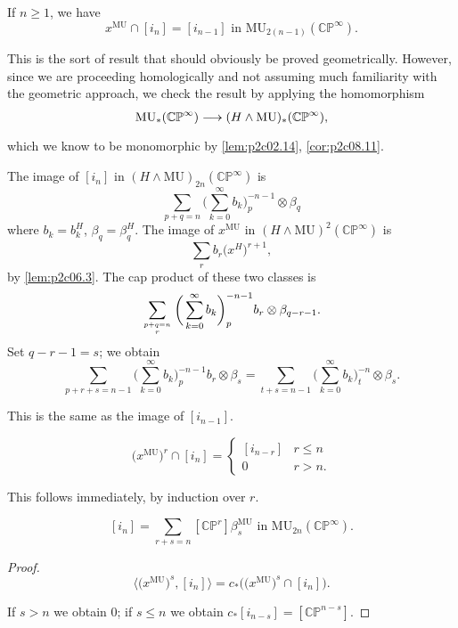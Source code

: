 \documentclass[../main]{subfiles}
\begin{document}
\begin{lemma}
\label{lem:ch210.3}
If $n \ge 1$, we have \[x^{\mathrm{MU}} \cap [i_n] = [i_{n - 1}] \text { in } \mathrm{MU}_{2(n - 1)} (\mathbb {CP}^\infty).\]
\end{lemma}

This is the sort of result that should obviously be proved geometrically. However, since we are proceeding homologically and not assuming much familiarity with the geometric approach, we check the result by applying the homomorphism \[\mathrm{MU}_\ast (\mathbb {CP}^\infty) \lar{} (H \wedge \mathrm{MU})_\ast (\mathbb {CP}^\infty),\] which we know to be monomorphic by \ref{lem:p2c02.14}, \ref{cor:p2c08.11}. 

The image of $[i_n]$ in $(H \wedge \mathrm{MU})_{2n} (\mathbb {CP}^\infty)$ is \[\sum_{p + q = n} \bigg(\sum_{k = 0}^\infty b_k\bigg)_p^{-n - 1} \otimes \beta_q\] where $b_k = b_k^H$, $\beta_q = \beta_q^H$. The image of $x^{\mathrm{MU}}$ in $(H \wedge \mathrm{MU})^2(\mathbb {CP}^\infty)$ is \[\sum_r b_r \big(x^H\big)^{r + 1},\] by \eqref{lem:p2c06.3}. The cap product of these two classes is \[\sum_{{p + q = n} \atop r} \bigg(\sum_{k = 0}^\infty b_k\bigg)_p^{-n - 1} b_r \otimes \beta_{q - r - 1}.\] Set $q - r - 1 = s$; we obtain \[\sum_{p + r + s = n - 1} \bigg(\sum_{k = 0}^\infty b_k\bigg)_p^{-n - 1} b_r \otimes \beta_s = \sum_{t + s = n - 1} \bigg(\sum_{k = 0}^\infty b_k\bigg)_t^{-n} \otimes \beta_s.\]

This is the same as the image of $[i_{n - 1}]$. 

\begin{corollary}
\label{cor:p2c10.4}
\[\big(x^{\mathrm{MU}}\big)^r \cap [i_n] = \begin{cases}[i_{n - r}] & r \le n \\ 0 & r > n.\end{cases}\]
\end{corollary}

This follows immediately, by induction over $r$. 

\begin{corollary}
\label{cor:p2c10.5}
\[[i_n] = \sum_{r + s = n} [\mathbb {CP}^r] \beta_s^{\mathrm{MU}} \text { in } \mathrm {MU}_{2n} (\mathbb {CP}^\infty).\]
\end{corollary}
\begin{proof}
\[\big\langle \big(x^{\mathrm{MU}}\big)^s, [i_n]\big\rangle = c_\ast \big(\big(x^{\mathrm {MU}}\big)^s \cap [i_n]\big).\]

If $s > n$ we obtain $0$; if $s \le n$ we obtain $c_\ast[i_{n - s}] = [\mathbb {CP}^{n - s}]$.
\end{proof}
\end{document}
